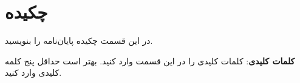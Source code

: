 \clearpage
\section*{چکیده}
در این قسمت چکیده پایان‌نامه را بنویسید.

\vskip 5mm
\noindent\textbf{کلمات کلیدی}:
کلمات کلیدی را در این قسمت وارد کنید. بهتر است حداقل پنج کلمه کلیدی وارد کنید.